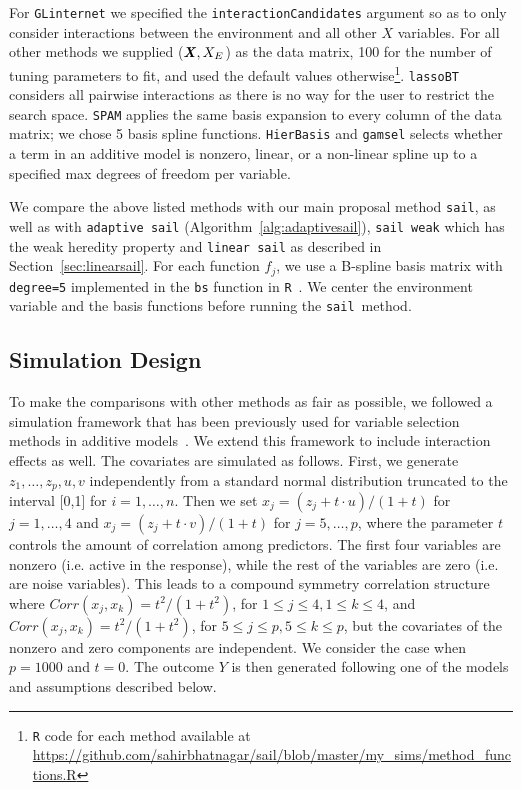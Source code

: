 \documentclass[12pt,letter]{article}\usepackage[]{graphicx}\usepackage[]{color}
\newcommand{\sail}{\texttt{sail}}
\newcommand{\bX}{\textbf{\emph{X}}}
\begin{document}
For \texttt{GLinternet} we specified the \texttt{interactionCandidates} argument so as to only consider interactions between the environment and all other $X$ variables. For all other methods we supplied ($\bX, X_E$) as the data matrix, 100 for the number of tuning parameters to fit, and used the default values otherwise\footnote[1]{\texttt{R} code for each method available at \url{https://github.com/sahirbhatnagar/sail/blob/master/my_sims/method_functions.R}}. \texttt{lassoBT} considers all pairwise interactions as there is no way for the user to restrict the search space. \texttt{SPAM} applies the same basis expansion to every column of the data matrix; we chose 5 basis spline functions. \texttt{HierBasis} and \texttt{gamsel} selects whether a term in an additive model is nonzero, linear, or a non-linear spline up to a specified max degrees of freedom per variable. 

We compare the above listed methods with our main proposal method \texttt{sail}, as well as with \texttt{adaptive sail} (Algorithm~\ref{alg:adaptivesail}), \texttt{sail weak} which has the weak heredity property and \texttt{linear sail} as described in Section~\ref{sec:linearsail}. For each function $f_j$, we use a B-spline basis matrix with \texttt{degree=5} implemented in the \texttt{bs} function in \texttt{R}~\citep{cran}. We center the environment variable and the basis functions before running the \sail ~method.


\subsection{Simulation Design}
To make the comparisons with other methods as fair as possible, we followed a simulation framework that has been previously used for variable selection methods in additive models~\citep{lin2006component,huang2010variable}. 
We extend this framework to include interaction effects as well. 
The covariates are simulated as follows. First, we generate $z_1,\ldots, z_p, u,v$ independently from a standard normal distribution truncated to the interval [0,1] for $i=1,\ldots,n$. Then we set $x_j = (z_j + t\cdot u)/(1 + t)$ for $j = 1,\ldots, 4$ and $x_j = (z_j + t\cdot v)/(1 + t)$ for $j = 5,\ldots, p$, where the parameter $t$ controls the amount of correlation among predictors. The first four variables are nonzero (i.e. active in the response), while the rest of the variables are zero (i.e. are noise variables). This leads to a compound symmetry correlation structure where $Corr(x_j,x_k) = t^2/(1+t^2)$, for $1 \leq j \leq 4, 1 \leq k \leq 4$, and $Corr(x_j,x_k) = t^2/(1+t^2)$, for $5 \leq j \leq p, 5 \leq k \leq p$, but the covariates of the nonzero and zero components are independent. We consider the case when $p=1000$ and $t=0$. The outcome $Y$ is then generated following one of the models and assumptions described below.
\end{document}
